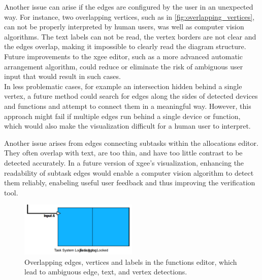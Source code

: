Another issue can arise if the edges are configured by the user in an unexpected way. For instance, two overlapping vertices, such as in \autoref{fig:overlapping_vertices}, can not be properly interpreted by human users, was well as computer vision algorithms. The text labels can not be read, the vertex borders are not clear and the edges overlap, making it impossible to clearly read the diagram structure. Future improvements to the \acrshort{xgee} editor, such as a more advanced automatic arrangement algorithm, could reduce or eliminate the risk of ambiguous user input that would result in such cases.\\
In less problematic cases, for example an intersection hidden behind a single vertex, a future method could search for edges along the sides of detected devices and functions and attempt to connect them in a meaningful way. However, this approach might fail if multiple edges run behind a single device or function, which would also make the visualization difficult for a human user to interpret.

Another issue arises from edges connecting subtasks within the allocations editor. They often overlap with text, are too thin, and have too little contrast to be detected accurately. In a future version of \acrshort{xgee}'s visualization, enhancing the readability of subtask edges would enable a computer vision algorithm to detect them reliably, enabeling useful user feedback and thus improving the verification tool.
\begin{figure}[h]
    \centering
    \includegraphics[width=0.5\textwidth]{pictures/93_modified_task_name_input_clip.png}
    \caption[Overlapping edges, vertices and labels]{Overlapping edges, vertices and labels in the functions editor, which lead to ambiguous edge, text, and vertex detections.}
    \label{fig:overlapping_vertices}
\end{figure}

